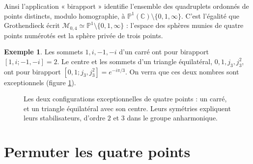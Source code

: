 \documentclass[11pt,a4paper]{article}
\theoremstyle{plain}
\theoremstyle{definition}
\newtheorem{exemple}[theoreme]{Exemple}
\theoremstyle{remark}
\newcommand{\C}{\mathbb{C}}
\newcommand{\Pu}{\mathbb{P}^1}
\begin{document}
Ainsi l'application « birapport » identifie l'ensemble des quadruplets ordonnés de points distincts, modulo homographie, à $\Pu(\C)\setminus\{0,1,\infty\}$. C'est l'égalité que Grothendieck écrit $\mathcal M_{0,4}\simeq\Pu\setminus\{0,1,\infty\}$ : l'espace des sphères munies de quatre points numérotés est la sphère privée de trois points.

\begin{exemple}\label{ex:configurations}
Les sommets $1,i,-1,-i$ d'un carré ont pour birapport $[1,i;-1,-i]=2$. Le centre et les sommets d'un triangle équilatéral, $0,1,j_3,j_3^2$, ont pour birapport $[0,1;j_3,j_3^2]=e^{-i\pi/3}$. On verra que ces deux nombres sont exceptionnels (figure \ref{fig:configurations}).
\end{exemple}

\begin{figure}[h]
\centering
{}
\caption{Les deux configurations exceptionnelles de quatre points : un carré, et un triangle équilatéral avec son centre. Leurs symétries expliquent leurs stabilisateurs, d'ordre $2$ et $3$ dans le groupe anharmonique.}\label{fig:configurations}
\end{figure}

\section{Permuter les quatre points}
\end{document}
